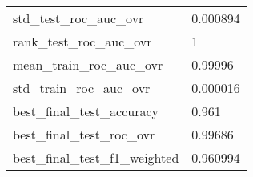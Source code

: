 \begin{tabular}{ll}
std\_test\_roc\_auc\_ovr          &                                           0.000894 \\
rank\_test\_roc\_auc\_ovr         &                                                  1 \\
mean\_train\_roc\_auc\_ovr        &                                            0.99996 \\
std\_train\_roc\_auc\_ovr         &                                           0.000016 \\
best\_final\_test\_accuracy      &                                              0.961 \\
best\_final\_test\_roc\_ovr       &                                            0.99686 \\
best\_final\_test\_f1\_weighted   &                                           0.960994 \\
\bottomrule
\end{tabular}
